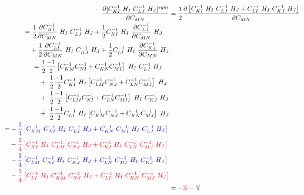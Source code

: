 \documentclass[11pt,a4paper,final]{article}
\begin{document}
\begin{align*}
\dfrac{\partial [C^{-1}_{KI} \ H_I \ C^{-1}_{LJ} \ H_J]^{sym}}{\partial C_{MN}} &= \dfrac{1}{2} \dfrac{\partial \left[ C^{-1}_{KI} \ H_I \ C^{-1}_{LJ} \ H_J + C^{-1}_{LI} \ H_I \ C^{-1}_{KJ} \ H_J \right] }{\partial C_{MN}}\\
\begin{split}
= & \ \dfrac{1}{2} \dfrac{\partial C^{-1}_{KI}}{\partial C_{MN}} \ H_I \ C^{-1}_{LJ} \ H_J + \dfrac{1}{2} C^{-1}_{KI} \ H_I \ \dfrac{\partial C^{-1}_{LJ}}{\partial C_{MN}} \ H_J \\
&+ \dfrac{1}{2} \dfrac{\partial C^{-1}_{LI}}{\partial C_{MN}} \ H_I \ C^{-1}_{KJ} \ H_J + \dfrac{1}{2} C^{-1}_{LI} \ H_I \ \dfrac{\partial C^{-1}_{KJ}}{\partial C_{MN}} \ H_J \\
\end{split}\\
\begin{split}
= & \ \dfrac{1}{2} \dfrac{-1}{2} \left[ C^{-1}_{KM} C^{-1}_{NI} + C^{-1}_{KN} C^{-1}_{MI} \right] \ H_I \ C^{-1}_{LJ} \ H_J \\
&+ \ \dfrac{1}{2} \dfrac{-1}{2} C^{-1}_{KI} \ H_I \left[ C^{-1}_{LM} C^{-1}_{NJ} + C^{-1}_{LN} C^{-1}_{MJ} \right] \ H_J \\
&+ \ \dfrac{1}{2} \dfrac{-1}{2} \left[ C^{-1}_{LM} C^{-1}_{NI} + C^{-1}_{LN} C^{-1}_{MI} \right] \ H_I \ C^{-1}_{KJ} \ H_J \\
&+ \ \dfrac{1}{2} \dfrac{-1}{2} C^{-1}_{LI} \ H_I \left[ C^{-1}_{KM} C^{-1}_{NJ} + C^{-1}_{KN} C^{-1}_{MJ} \right] \ H_J \\
\end{split}\\
\begin{split}
= &- \textcolor{blue}{\dfrac{1}{4} \left[ C^{-1}_{KM} \ C^{-1}_{NI} \ H_I \ C^{-1}_{LJ} \ H_J + C^{-1}_{KN} \ C^{-1}_{MI} \ H_I \ C^{-1}_{LJ} \ H_J \right]} \\
&- \textcolor{red}{\dfrac{1}{4} \left[ C^{-1}_{KI} \ H_I \ C^{-1}_{LM} \ C^{-1}_{NJ} \ H_J + C^{-1}_{KI} \ H_I \ C^{-1}_{LN} \ C^{-1}_{MJ} \ H_J \right]} \\
&- \textcolor{blue}{\dfrac{1}{4} \left[ C^{-1}_{LM} \ C^{-1}_{NI} \ H_I \ C^{-1}_{KJ} \ H_J + C^{-1}_{LN} \ C^{-1}_{MI} \ H_I \ C^{-1}_{KJ} \ H_J \right]} \\
&- \textcolor{red}{\dfrac{1}{4} \left[ C^{-1}_{LI} \ H_I \ C^{-1}_{KM} \ C^{-1}_{NJ} \ H_J + C^{-1}_{LI} \ H_I \ C^{-1}_{KN} \ C^{-1}_{MJ} \ H_J \right]}\\
\end{split}\\
&= -\textcolor{red}{\mathbb{X}} - \textcolor{blue}{\mathbb{Y}}
\end{align*}
\end{document}

